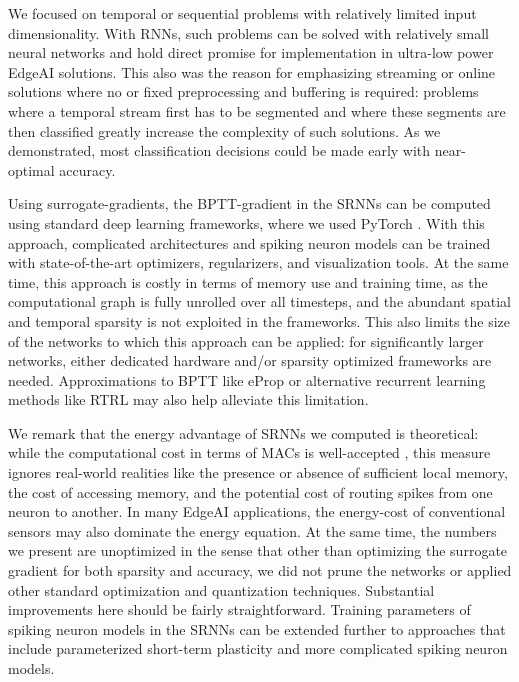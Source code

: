 \documentclass[fleqn,10pt]{wlscirep}
\begin{document}
We focused on temporal or sequential problems with relatively limited input dimensionality. With RNNs, such problems can be solved with relatively small neural networks and hold direct promise for implementation in ultra-low power EdgeAI solutions. This also was the reason for emphasizing streaming or online solutions where no or fixed preprocessing and buffering is required: problems where a temporal stream first has to be segmented and where these segments are then classified greatly increase the complexity of such solutions. As we demonstrated, most classification decisions could be made early with near-optimal accuracy. 



Using surrogate-gradients, the BPTT-gradient in the SRNNs can be computed using standard deep learning frameworks, where we used PyTorch \cite{paszke2019pytorch}. With this approach, complicated architectures and spiking neuron models can be trained with state-of-the-art optimizers, regularizers, and visualization tools. At the same time, this approach is costly in terms of memory use and training time, as the computational graph is fully unrolled over all timesteps, and the abundant spatial and temporal sparsity is not exploited in the frameworks. This also limits the size of the networks to which this approach can be applied: for significantly larger networks, either dedicated hardware and/or sparsity optimized frameworks are needed\cite{zenkebohte2021}. Approximations to BPTT like eProp \cite{bellec2020solution} or alternative recurrent learning methods like RTRL\cite{zenke2021brain} may also help alleviate this limitation. 

We remark that the energy advantage of SRNNs we computed is theoretical: while the computational cost in terms of MACs is well-accepted \cite{kundu2021spike,wong2020tinyspeech}, this measure ignores real-world realities like the presence or absence of sufficient local memory, the cost of accessing memory, and the potential cost of routing spikes from one neuron to another. In many EdgeAI applications, the energy-cost of conventional sensors may also dominate the energy equation. At the same time, the numbers we present are unoptimized in the sense that other than optimizing the surrogate gradient for both sparsity and accuracy, we did not prune the networks or applied other standard optimization and quantization techniques. Substantial improvements here should be fairly straightforward. Training parameters of spiking neuron models in the SRNNs can be extended further to approaches that include parameterized short-term plasticity \cite{keijser2020interneuron} and more complicated spiking neuron models. 
\end{document}
